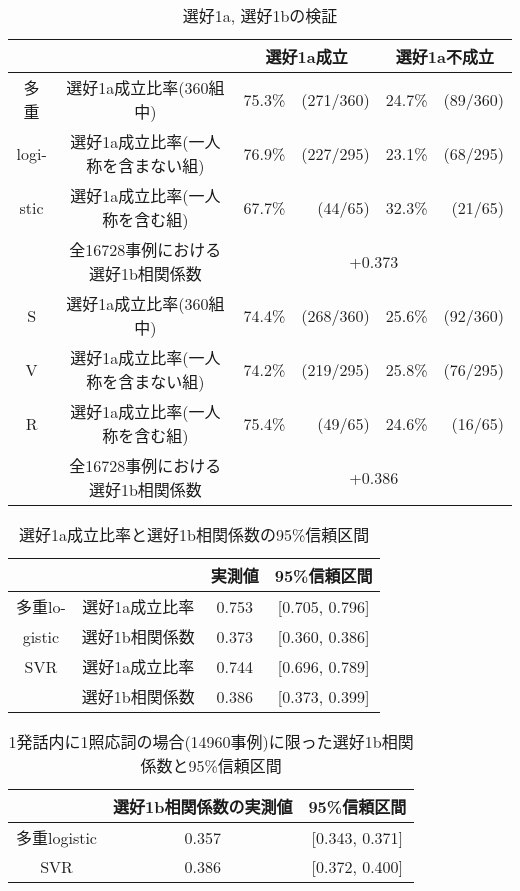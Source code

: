 \begin{table}
\begin{center}
\begin{tabular}{|c|c||rr|rr|}
\hline
\multicolumn{2}{|c||}{}&\multicolumn{2}{|c|}{選好1a成立}&\multicolumn{2}{|c|}{選好1a不成立}\\
\hline\hline
多重&選好1a成立比率(360組中)&75.3\%&(271/360)&24.7\%&(89/360)\\
\cline{2-6}
logi-&選好1a成立比率(一人称を含まない組)&76.9\%&(227/295)&23.1\%&(68/295)\\
\cline{2-6}
stic&選好1a成立比率(一人称を含む組)&67.7\%&(44/65)&32.3\%&(21/65)\\
\cline{2-6}
&全16728事例における選好1b相関係数&\multicolumn{4}{|c|}{+0.373}\\
\hline\hline
S&選好1a成立比率(360組中)&74.4\%&(268/360)&25.6\%&(92/360)\\
\cline{2-6}
V&選好1a成立比率(一人称を含まない組)&74.2\%&(219/295)&25.8\%&(76/295)\\
\cline{2-6}
R&選好1a成立比率(一人称を含む組)&75.4\%&(49/65)&24.6\%&(16/65)\\
\cline{2-6}
&全16728事例における選好1b相関係数&\multicolumn{4}{|c|}{+0.386}\\
\hline
\end{tabular}
\end{center}
\caption{選好1a, 選好1bの検証}
\label{tab:rule1}
\end{table}


\begin{table}
\begin{center}
\begin{tabular}{|c|c||c|c|}
\hline
\multicolumn{2}{|c||}{}&実測値&95\%信頼区間\\
\hline\hline
多重lo-&選好1a成立比率&0.753&[0.705, 0.796]\\
\cline{2-4}
gistic&選好1b相関係数&0.373&[0.360, 0.386]\\
\hline
SVR&選好1a成立比率&0.744&[0.696, 0.789]\\
\cline{2-4}
&選好1b相関係数&0.386&[0.373, 0.399]\\
\hline
\end{tabular}
\end{center}
\caption{選好1a成立比率と選好1b相関係数の95\%信頼区間}
\label{tab:confi}
\end{table}

\begin{table}
\begin{center}
\begin{tabular}{|c||c|c|}
\hline
&選好1b相関係数の実測値&95\%信頼区間\\
\hline\hline
多重logistic&0.357&[0.343, 0.371]\\
\hline
SVR&0.386&[0.372, 0.400]\\
\hline
\end{tabular}
\end{center}
\caption{1発話内に1照応詞の場合(14960事例)に限った選好1b相関係数と95\%信頼区間}
\label{tab:confi_1}
\end{table}

